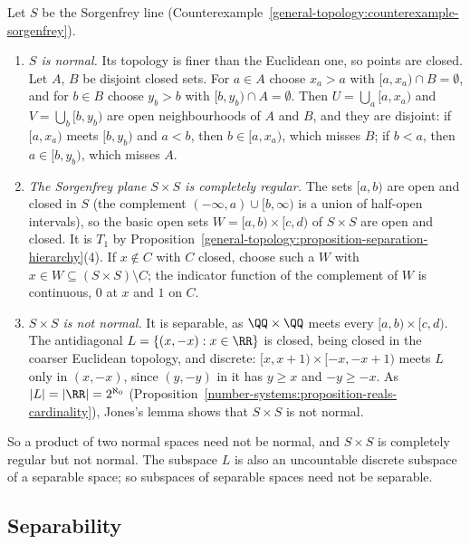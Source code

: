 \begin{example}\label{general-topology:example-sorgenfrey-plane}
Let $S$ be the Sorgenfrey line (Counterexample~\ref{general-topology:counterexample-sorgenfrey}).
\begin{enumerate}
\item \emph{$S$ is normal.} Its topology is finer than the Euclidean one, so points are closed. Let $A$, $B$ be disjoint closed sets. For $a \in A$ choose $x_a > a$ with $[a, x_a) \cap B = \emptyset$, and for
$b \in B$ choose $y_b > b$ with $[b, y_b) \cap A = \emptyset$. Then $U = \bigcup_a[a, x_a)$ and $V = \bigcup_b[b, y_b)$ are open neighbourhoods of $A$ and $B$, and they are disjoint: if $[a, x_a)$ meets
$[b, y_b)$ and $a < b$, then $b \in [a, x_a)$, which misses $B$; if $b < a$, then $a \in [b, y_b)$, which misses $A$.
\item \emph{The Sorgenfrey plane $S \times S$ is completely regular.} The sets $[a, b)$ are open and closed in $S$ (the complement $(-\infty, a) \cup [b, \infty)$ is a union of half-open intervals), so the
basic open sets $W = [a, b) \times [c, d)$ of $S \times S$ are open and closed. It is $T_1$ by Proposition~\ref{general-topology:proposition-separation-hierarchy}(4). If $x \notin C$ with $C$ closed, choose
such a $W$ with $x \in W \subseteq (S \times S) \setminus C$; the indicator function of the complement of $W$ is continuous, $0$ at $x$ and $1$ on $C$.
\item \emph{$S \times S$ is not normal.} It is separable, as $\QQ \times \QQ$ meets every $[a, b) \times [c, d)$. The antidiagonal $L = \{(x, -x) : x \in \RR\}$ is closed, being closed in the coarser
Euclidean topology, and discrete: $[x, x + 1) \times [-x, -x + 1)$ meets $L$ only in $(x, -x)$, since $(y, -y)$ in it has $y \geq x$ and $-y \geq -x$. As $|L| = |\RR| = 2^{\aleph_0}$
(Proposition~\ref{number-systems:proposition-reals-cardinality}), Jones's lemma shows that $S \times S$ is not normal.
\end{enumerate}
So a product of two normal spaces need not be normal, and $S \times S$ is completely regular but not normal. The subspace $L$ is also an uncountable discrete subspace of a separable space; so subspaces of
separable spaces need not be separable.
\end{example}

\subsection{Separability}\label{general-topology:subsection-separability}

